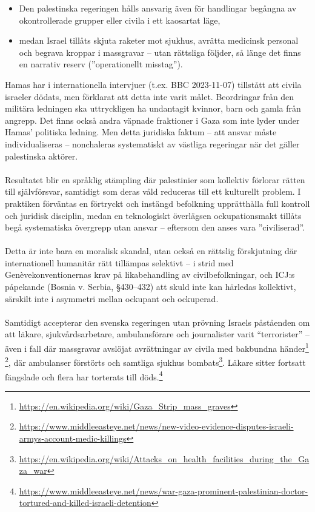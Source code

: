 \begin{itemize}
\item Den palestinska regeringen hålls ansvarig även för handlingar begångna av okontrollerade grupper eller civila i ett kaosartat läge,
\item medan Israel tillåts skjuta raketer mot sjukhus, avrätta medicinsk personal och begrava kroppar i massgravar – utan rättsliga följder, så länge det finns en narrativ reserv (”operationellt misstag”).
\end{itemize}

Hamas har i internationella intervjuer (t.ex. BBC 2023-11-07) tillstått att civila israeler dödats, men förklarat att detta inte varit målet. Beordringar från den militära ledningen ska uttryckligen ha undantagit kvinnor, barn och gamla från angrepp. Det finns också andra väpnade fraktioner i Gaza som inte lyder under Hamas’ politiska ledning. Men detta juridiska faktum – att ansvar måste individualiseras – nonchaleras systematiskt av västliga regeringar när det gäller palestinska aktörer.

\paragraph{}
Resultatet blir en språklig stämpling där palestinier som kollektiv förlorar rätten till självförsvar, samtidigt som deras våld reduceras till ett kulturellt problem. I praktiken förväntas en förtryckt och instängd befolkning upprätthålla full kontroll och juridisk disciplin, medan en teknologiskt överlägsen ockupationsmakt tillåts begå systematiska övergrepp utan ansvar – eftersom den anses vara ”civiliserad”.

\paragraph{}
Detta är inte bara en moralisk skandal, utan också en rättslig förskjutning där internationell humanitär rätt tillämpas selektivt – i strid med Genèvekonventionernas krav på likabehandling av civilbefolkningar, och ICJ:s påpekande (Bosnia v. Serbia, §430–432) att skuld inte kan härledas kollektivt, särskilt inte i asymmetri mellan ockupant och ockuperad.

\paragraph{}
Samtidigt accepterar den svenska regeringen utan prövning Israels påståenden om att läkare, sjukvårdsarbetare, ambulansförare och journalister varit \enquote{terrorister} – även i fall där massgravar avslöjat avrättningar av civila med bakbundna händer\footnote{\url{https://en.wikipedia.org/wiki/Gaza_Strip_mass_graves}} \footnote{\url{https://www.middleeasteye.net/news/new-video-evidence-disputes-israeli-armys-account-medic-killings}}, där ambulanser förstörts och samtliga sjukhus bombats\footnote{\url{https://en.wikipedia.org/wiki/Attacks_on_health_facilities_during_the_Gaza_war}}. Läkare sitter fortsatt fängslade och flera har torterats till döds.\footnote{\url{https://www.middleeasteye.net/news/war-gaza-prominent-palestinian-doctor-tortured-and-killed-israeli-detention}}

